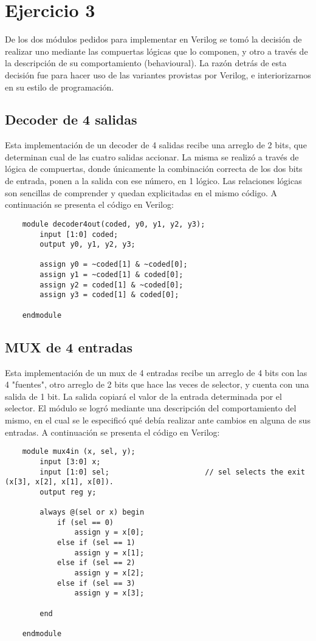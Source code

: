 \section{Ejercicio 3}
De los dos módulos pedidos para implementar en Verilog se tomó la decisión de realizar uno mediante las compuertas lógicas que lo componen, y otro a través de la descripción de su comportamiento (behavioural).
La razón detrás de esta decisión fue para hacer uso de las variantes provistas por Verilog, e interiorizarnos en su estilo de programación.

\subsection{Decoder de 4 salidas}
Esta implementación de un decoder de 4 salidas recibe una arreglo de 2 bits, que determinan cual de las cuatro salidas accionar.
La misma se realizó a través de lógica de compuertas, donde únicamente la combinación correcta de los dos bits de entrada, ponen a la salida con ese número, en 1 lógico.
Las relaciones lógicas son sencillas de comprender y quedan explicitadas en el mismo código.
A continuación se presenta el código en Verilog:
\begin{lstlisting}
    module decoder4out(coded, y0, y1, y2, y3);
        input [1:0] coded;
        output y0, y1, y2, y3;

        assign y0 = ~coded[1] & ~coded[0];
        assign y1 = ~coded[1] & coded[0];
        assign y2 = coded[1] & ~coded[0];
        assign y3 = coded[1] & coded[0];

    endmodule
\end{lstlisting}

\subsection{MUX de 4 entradas}
Esta implementación de un mux de 4 entradas recibe un arreglo de 4 bits con las 4 "fuentes", otro arreglo de 2 bits que hace las veces de selector, y cuenta con una salida de 1 bit.
La salida copiará el valor de la entrada determinada por el selector.
El módulo se logró mediante una descripción del comportamiento del mismo, en el cual se le especificó qué debía realizar ante cambios en alguna de sus entradas.
A continuación se presenta el código en Verilog:
\begin{lstlisting}
    module mux4in (x, sel, y);
        input [3:0] x;
        input [1:0] sel;                      // sel selects the exit (x[3], x[2], x[1], x[0]).
        output reg y;

        always @(sel or x) begin
            if (sel == 0)
                assign y = x[0];
            else if (sel == 1)
                assign y = x[1];
            else if (sel == 2)
                assign y = x[2];
            else if (sel == 3)
                assign y = x[3];

        end

    endmodule
\end{lstlisting}

